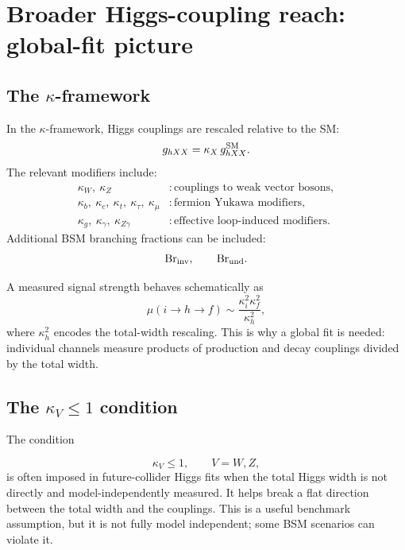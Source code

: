 \documentclass[11pt,a4paper]{article}
\begin{document}
\section{Broader Higgs-coupling reach: global-fit picture}

\subsection{The \(\kappa\)-framework}


In the \(\kappa\)-framework, Higgs couplings are rescaled relative to the SM:
\begin{equation}
  g_{hXX}=\kappa_X\,g_{hXX}^{\rm SM}.
\end{equation}
The relevant modifiers include:
\begin{align}
  \kappa_W,\ \kappa_Z &: \text{couplings to weak vector bosons},\\
  \kappa_b,\ \kappa_c,\ \kappa_t,\ \kappa_\tau,\ \kappa_\mu &: \text{fermion Yukawa modifiers},\\
  \kappa_g,\ \kappa_\gamma,\ \kappa_{Z\gamma} &: \text{effective loop-induced modifiers}.
\end{align}
Additional BSM branching fractions can be included:
\[
  {\rm Br}_{\rm inv},\qquad {\rm Br}_{\rm und}.
\]

A measured signal strength behaves schematically as
\begin{equation}
  \mu(i\to h\to f)
  \sim
  \frac{\kappa_i^2\kappa_f^2}{\kappa_h^2},
\end{equation}
where \(\kappa_h^2\) encodes the total-width rescaling.  This is why a global fit is needed:
individual channels measure products of production and decay couplings divided by the total width.



\subsection{The \(\kappa_V\le1\) condition}

The condition

\begin{equation}
  \kappa_V\le1,\qquad V=W,Z,
\end{equation}
is often imposed in future-collider Higgs fits when the total Higgs width is not directly and
model-independently measured.  It helps break a flat direction between the total width and
the couplings.  This is a useful benchmark assumption, but it is not fully model independent;
some BSM scenarios can violate it.
\end{document}
